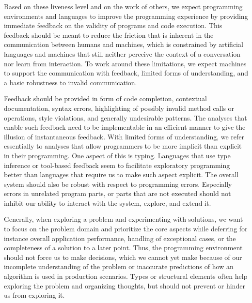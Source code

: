 \documentclass[sigconf, 10pt]{acmart}
\begin{document}
Based on these liveness level and on the work of others\citep{McDirmid:2007:LUL,Burckhardt:2013:ACF,Rein:2016:LLP},
we expect programming environments and languages
to improve the programming experience by providing immediate feedback on
the validity of programs and code execution.
This feedback should be meant to reduce the friction
that is inherent in the communication between humans and machines,
which is constrained by artificial languages and machines
that still neither perceive the context of a conversation nor learn from interaction.
To work around these limitations,
we expect machines to support the communication with feedback,
limited forms of understanding,
and a basic robustness to invalid communication.

Feedback should be provided in form of
code completion, contextual documentation,
syntax errors, highlighting of possibly invalid method calls or operations,
style violations, and generally undesirable patterns.
The analyses that enable such feedback need to be implementable
in an efficient manner to give the illusion of instantaneous feedback.
%
With limited forms of understanding,
we refer essentially to analyses
that allow programmers to be more implicit than explicit in their programming.
One aspect of this is typing.
Languages that use type inference
or tool-based feedback seem to facilitate exploratory programming better
than languages that require us to make such aspect explicit.
%   
The overall system should also be robust with respect to programming errors.
Especially errors in unrelated program parts,
or parts that are not executed
should not inhibit our ability to interact with the system,
explore, and extend it.

Generally, when exploring a problem and experimenting with solutions,
we want to focus on the problem domain and prioritize the core aspects
while deferring for instance overall application performance,
handling of exceptional cases,
or the completeness of a solution to a later point.
Thus, the programming environment should not force us to make decisions,
which we cannot yet make because of our incomplete understanding of the problem
or inaccurate predictions of how an algorithm is used in production scenarios.
Types or structural elements often help exploring
the problem and organizing thoughts,
but should not prevent or hinder us from exploring it.
\end{document}
